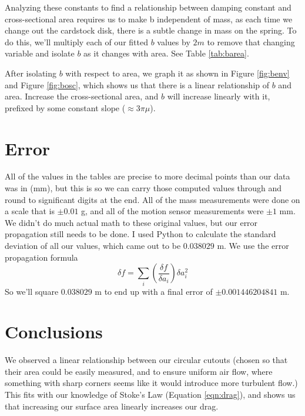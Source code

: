\documentclass[12pt,letterpaper]{article}
\begin{document}
Analyzing these constants to find a relationship between damping constant and cross-sectional area requires us to make b independent of mass, as each time we change out the cardstock disk, there is a subtle change in mass on the spring. To do this, we'll multiply each of our fitted $b$ values by $2m$ to remove that changing variable and isolate $b$ as it changes with area. See Table \ref{tab:barea}.

After isolating $b$ with respect to area, we graph it as shown in Figure \ref{fig:benv} and Figure \ref{fig:bosc}, which shows us that there is a linear relationship of $b$ and area. Increase the cross-sectional area, and $b$ will increase linearly with it, prefixed by some constant slope ($\approx3\pi\mu$).

\section{Error}

All of the values in the tables are precise to more decimal points than our data was in (mm), but this is so we can carry those computed values through and round to significant digits at the end. All of the mass measurements were done on a scale that is $± 0.01$ g, and all of the motion sensor measurements were $± 1$ mm. We didn't do much actual math to these original values, but our error propagation still needs to be done. I used Python to calculate the standard deviation of all our values, which came out to be $0.038029$ m. We use the error propagation formula
\begin{equation}
    \delta f=\sum_i \left(\frac{\delta f}{\delta a_i}\right)\delta a_i^2
\end{equation}
So we'll square $0.038029$ m to end up with a final error of $± \mathbf{0.001446204841}$ m.

\section{Conclusions}

We observed a linear relationship between our circular cutouts (chosen so that their area could be easily measured, and to ensure uniform air flow, where something with sharp corners seems like it would introduce more turbulent flow.) This fits with our knowledge of Stoke's Law (Equation \ref{eqn:drag}), and shows us that increasing our surface area linearly increases our drag.
\end{document}
